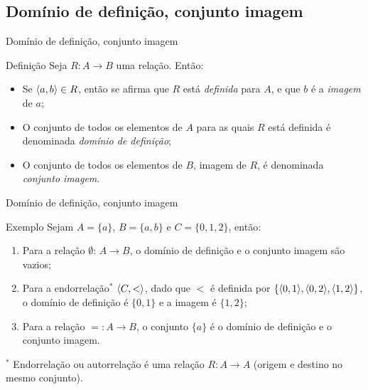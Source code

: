 \def\mysection{Domínio de definição, conjunto imagem}

\subsection{\mysection}

\begin{frame}{\mysection}
  
  \begin{block}{Definição}
    Seja {\bf $R:A\rightarrow B$} uma relação. Então:

    \begin{itemize}[<+-| alert@+>]
    \item Se $\langle a,b\rangle\in R$, então se afirma que $R$ está \emph{definida}
      para $A$, e que $b$ é a \emph{imagem} de $a$;
    \item O conjunto de todos os elementos de $A$ para as quais $R$
      está definida é denominada \emph{domínio de definição};
    \item O conjunto de todos os elementos de $B$, imagem de $R$, é
      denominada \emph{conjunto imagem}.
    \end{itemize}
  \end{block}
  
\end{frame}

\begin{frame}{\mysection}

  \begin{block}{Exemplo}
    Sejam $A=\{a\}$, $B=\{a,b\}$ e $C=\{0,1,2\}$, então:
    
    \begin{enumerate}[<+-| alert@+>]
    \item Para a relação $\emptyset$: $A\rightarrow B$, o domínio de
      definição e o conjunto imagem são vazios;
    \item Para a \alert{endorrelação$^*$} $\langle C,<\rangle$, dado que $<$ é
      definida por $\{\langle0,1\rangle, \langle0,2\rangle, \langle1,2\rangle\}$, o domínio de
      definição é $\{0,1\}$ e a imagem é $\{1,2\}$;
    \item Para a relação $=:A\rightarrow B$, o conjunto $\{a\}$ é o
      domínio de definição e o conjunto imagem.
    \end{enumerate}
  \end{block}

\hfill
$^*$ Endorrelação ou autorrelação é uma relação $R:A\rightarrow A$
(origem e destino no mesmo conjunto).
  
\end{frame}

